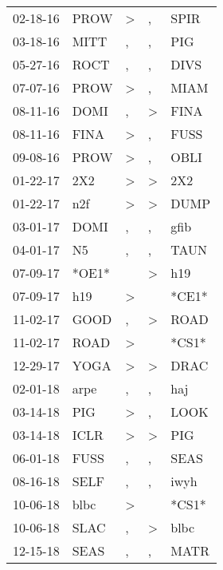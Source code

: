 \begin{supertabular}{lllll}
 02-18-16 &   PROW &     \textgreater &                , &   SPIR \\
 03-18-16 &   MITT &                , &                , &    PIG \\
 05-27-16 &   ROCT &                , &                , &   DIVS \\
 07-07-16 &   PROW &     \textgreater &                , &   MIAM \\
 08-11-16 &   DOMI &                , &     \textgreater &   FINA \\
 08-11-16 &   FINA &     \textgreater &                , &   FUSS \\
 09-08-16 &   PROW &     \textgreater &                , &   OBLI \\
 01-22-17 &    2X2 &     \textgreater &     \textgreater &    2X2 \\
 01-22-17 &    n2f &     \textgreater &     \textgreater &   DUMP \\
 03-01-17 &   DOMI &                , &                , &   gfib \\
 04-01-17 &     N5 &                , &                , &   TAUN \\
 07-09-17 &  *OE1* &                  &     \textgreater &    h19 \\
 07-09-17 &    h19 &     \textgreater &                  &  *CE1* \\
 11-02-17 &   GOOD &                , &     \textgreater &   ROAD \\
 11-02-17 &   ROAD &     \textgreater &                  &  *CS1* \\
 12-29-17 &   YOGA &     \textgreater &     \textgreater &   DRAC \\
 02-01-18 &   arpe &                , &                , &    haj \\
 03-14-18 &    PIG &     \textgreater &                , &   LOOK \\
 03-14-18 &   ICLR &     \textgreater &     \textgreater &    PIG \\
 06-01-18 &   FUSS &                , &                , &   SEAS \\
 08-16-18 &   SELF &                , &                , &   iwyh \\
 10-06-18 &   blbc &     \textgreater &                  &  *CS1* \\
 10-06-18 &   SLAC &                , &     \textgreater &   blbc \\
 12-15-18 &   SEAS &                , &                , &   MATR \\

\end{supertabular}
